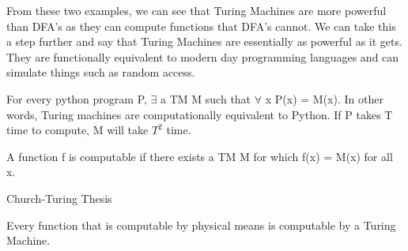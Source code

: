 From these two examples, we can see that Turing Machines are more powerful than DFA's as they can compute functions that DFA's cannot. We can take this a step further and say that Turing Machines are essentially as powerful as it gets. They are functionally equivalent to modern day programming languages and can simulate things such as random access.

\begin{theorem}
    
    For every python program P, $\exists$ a TM M such that $\forall$ x P(x) = M(x). In other words, Turing machines are computationally equivalent to Python. If P takes T time to compute, M will take $T^2$ time. 
\end{theorem}

\begin{theorem}
    A function f is computable if there exists a TM M for which f(x) = M(x) for all x. 
\end{theorem}

\vspace{1cm}


\begin{thesisframe}
    Church-Turing Thesis
    
    \vspace{.25cm}

    Every function that is computable by physical means is computable by a Turing Machine.
\end{thesisframe}


